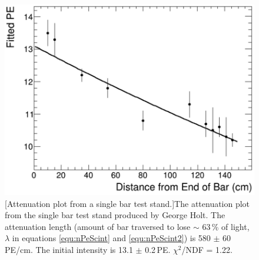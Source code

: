 \begin{figure}[!h]
 \centering
 \includegraphics[width=0.6\linewidth]{Chapter4/attenuation_plot_no_box.png} 
 [Attenuation plot from a single bar test stand.]{The attenuation plot from the single bar test stand produced by George Holt. The attenuation length (amount of bar traversed to lose $\sim$ 63\,\%  of light, $\lambda$ in equations \ref{equ:nPeScint} and \ref{equ:nPeScint2}) is 580 $\pm$ 60\,PE/cm. The initial intensity is 13.1 $\pm$ 0.2\,PE. $\chi^2$/NDF = 1.22.} 
 \label{fig:attenuationPlot}
\end{figure}

